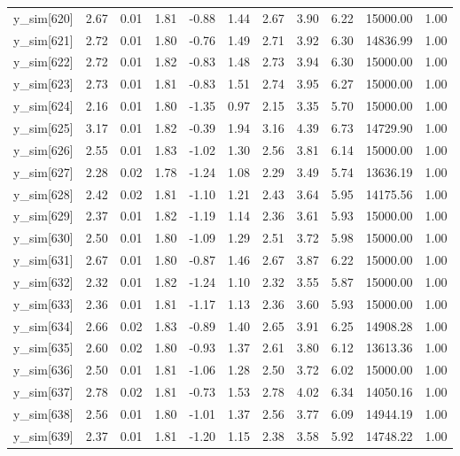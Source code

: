 \begin{table}[ht]
\begin{tabular}{rrrrrrrrrrr}
  y\_sim[620] & 2.67 & 0.01 & 1.81 & -0.88 & 1.44 & 2.67 & 3.90 & 6.22 & 15000.00 & 1.00 \\ 
  y\_sim[621] & 2.72 & 0.01 & 1.80 & -0.76 & 1.49 & 2.71 & 3.92 & 6.30 & 14836.99 & 1.00 \\ 
  y\_sim[622] & 2.72 & 0.01 & 1.82 & -0.83 & 1.48 & 2.73 & 3.94 & 6.30 & 15000.00 & 1.00 \\ 
  y\_sim[623] & 2.73 & 0.01 & 1.81 & -0.83 & 1.51 & 2.74 & 3.95 & 6.27 & 15000.00 & 1.00 \\ 
  y\_sim[624] & 2.16 & 0.01 & 1.80 & -1.35 & 0.97 & 2.15 & 3.35 & 5.70 & 15000.00 & 1.00 \\ 
  y\_sim[625] & 3.17 & 0.01 & 1.82 & -0.39 & 1.94 & 3.16 & 4.39 & 6.73 & 14729.90 & 1.00 \\ 
  y\_sim[626] & 2.55 & 0.01 & 1.83 & -1.02 & 1.30 & 2.56 & 3.81 & 6.14 & 15000.00 & 1.00 \\ 
  y\_sim[627] & 2.28 & 0.02 & 1.78 & -1.24 & 1.08 & 2.29 & 3.49 & 5.74 & 13636.19 & 1.00 \\ 
  y\_sim[628] & 2.42 & 0.02 & 1.81 & -1.10 & 1.21 & 2.43 & 3.64 & 5.95 & 14175.56 & 1.00 \\ 
  y\_sim[629] & 2.37 & 0.01 & 1.82 & -1.19 & 1.14 & 2.36 & 3.61 & 5.93 & 15000.00 & 1.00 \\ 
  y\_sim[630] & 2.50 & 0.01 & 1.80 & -1.09 & 1.29 & 2.51 & 3.72 & 5.98 & 15000.00 & 1.00 \\ 
  y\_sim[631] & 2.67 & 0.01 & 1.80 & -0.87 & 1.46 & 2.67 & 3.87 & 6.22 & 15000.00 & 1.00 \\ 
  y\_sim[632] & 2.32 & 0.01 & 1.82 & -1.24 & 1.10 & 2.32 & 3.55 & 5.87 & 15000.00 & 1.00 \\ 
  y\_sim[633] & 2.36 & 0.01 & 1.81 & -1.17 & 1.13 & 2.36 & 3.60 & 5.93 & 15000.00 & 1.00 \\ 
  y\_sim[634] & 2.66 & 0.02 & 1.83 & -0.89 & 1.40 & 2.65 & 3.91 & 6.25 & 14908.28 & 1.00 \\ 
  y\_sim[635] & 2.60 & 0.02 & 1.80 & -0.93 & 1.37 & 2.61 & 3.80 & 6.12 & 13613.36 & 1.00 \\ 
  y\_sim[636] & 2.50 & 0.01 & 1.81 & -1.06 & 1.28 & 2.50 & 3.72 & 6.02 & 15000.00 & 1.00 \\ 
  y\_sim[637] & 2.78 & 0.02 & 1.81 & -0.73 & 1.53 & 2.78 & 4.02 & 6.34 & 14050.16 & 1.00 \\ 
  y\_sim[638] & 2.56 & 0.01 & 1.80 & -1.01 & 1.37 & 2.56 & 3.77 & 6.09 & 14944.19 & 1.00 \\ 
  y\_sim[639] & 2.37 & 0.01 & 1.81 & -1.20 & 1.15 & 2.38 & 3.58 & 5.92 & 14748.22 & 1.00 \\ 

\end{tabular}
\end{table}
